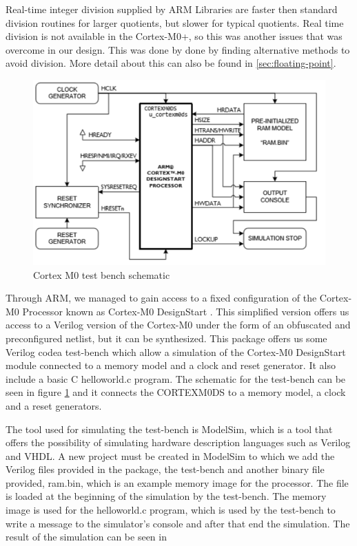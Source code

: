 Real-time integer division supplied by ARM Libraries are faster then standard division routines for larger quotients, but slower for typical  quotients. Real time division is not available in the Cortex-M0+, so this was another issues that was overcome in our design. This was done by done by finding alternative methods to avoid division. More detail about this can also be found in \ref{sec:floating-point}.
\begin{figure}
\centering
\includegraphics[scale=0.7]{figures/test_bench_schematic.PNG}
\caption{Cortex M0 test bench schematic} \label{fig:test_bench}
\end{figure}

Through ARM, we managed to gain access to a fixed configuration of the Cortex-M0 Processor known as Cortex-M0 DesignStart \cite{armdesignstart}. This simplified version offers us access to a Verilog version of the Cortex-M0 under the form of an obfuscated and preconfigured netlist, but it can be synthesized. This package offers us some Verilog codea test-bench which allow a simulation of the Cortex-M0 DesignStart module connected to a memory model and a clock and reset generator. It also include a basic C helloworld.c program. The schematic for the test-bench can be seen in figure \ref{fig:test_bench} and it connects the CORTEXM0DS to a memory model, a clock and a reset generators.

The tool used for simulating the test-bench is ModelSim, which is a tool that offers the possibility of simulating hardware description languages such as Verilog and VHDL. A new project must be created in ModelSim to which we add the Verilog files provided in the package, the test-bench and another binary file provided, ram.bin, which is an example memory image for the processor. The file is loaded at the beginning of the simulation by the test-bench.  The memory image is used for the helloworld.c program, which is used by the test-bench to write a message to the simulator's console and after that end the simulation. The result of the simulation can be seen in

